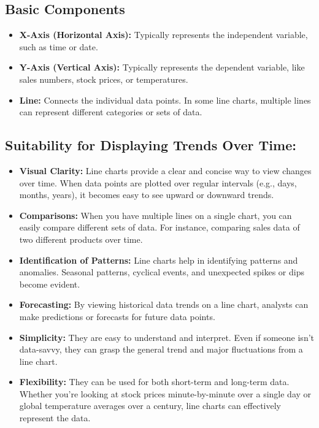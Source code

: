 \documentclass{article}\usepackage[]{graphicx}\usepackage[]{xcolor}
\begin{document}
\subsection{Basic Components}
\begin{itemize}
  \item \textbf{X-Axis (Horizontal Axis):} Typically represents the independent variable, such as time or date.
  \item \textbf{Y-Axis (Vertical Axis):} Typically represents the dependent variable, like sales numbers, stock prices, or temperatures.
  \item \textbf{Line:} Connects the individual data points. In some line charts, multiple lines can represent different categories or sets of data.
\end{itemize}


\subsection{Suitability for Displaying Trends Over Time:}
\begin{itemize}
    \item \textbf{Visual Clarity:} Line charts provide a clear and concise way to view changes over time. When data points are plotted over regular intervals (e.g., days, months, years), it becomes easy to see upward or downward trends.
    \item \textbf{Comparisons:} When you have multiple lines on a single chart, you can easily compare different sets of data. For instance, comparing sales data of two different products over time.
    \item \textbf{Identification of Patterns:} Line charts help in identifying patterns and anomalies. Seasonal patterns, cyclical events, and unexpected spikes or dips become evident.
    \item \textbf{Forecasting:} By viewing historical data trends on a line chart, analysts can make predictions or forecasts for future data points.
    \item \textbf{Simplicity:} They are easy to understand and interpret. Even if someone isn't data-savvy, they can grasp the general trend and major fluctuations from a line chart.
    \item \textbf{Flexibility:} They can be used for both short-term and long-term data. Whether you're looking at stock prices minute-by-minute over a single day or global temperature averages over a century, line charts can effectively represent the data.
\end{itemize}
\end{document}
